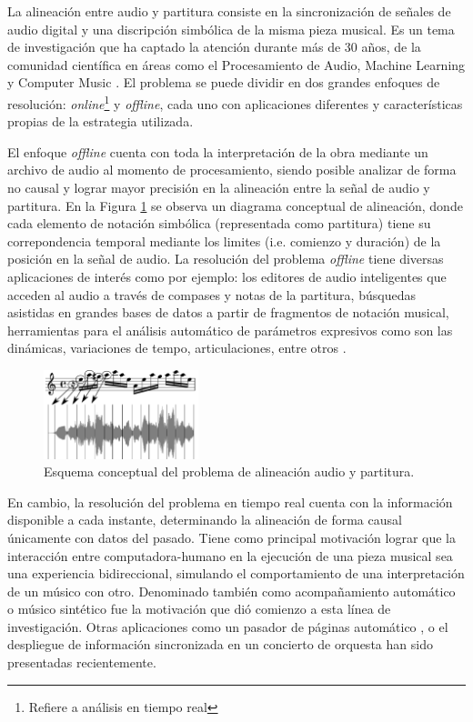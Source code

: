 \documentclass
  [ams,pdfout]%
	{aeslac}
\begin{document}
La alineación entre audio y partitura consiste en la sincronización de señales de audio digital y una discripción simbólica de la misma pieza musical. Es un tema de investigación que ha captado la atención durante más de 30 años, de la comunidad científica en áreas como el Procesamiento de Audio, Machine Learning y Computer Music \cite{orio2003score}. El problema se puede dividir en dos grandes enfoques de resolución: \textit{online}\footnote{Refiere a análisis en tiempo real} y \textit{offline}, cada uno con aplicaciones diferentes y características propias de la estrategia utilizada.

%
El enfoque \textit{offline} cuenta con toda la interpretación de la obra mediante un archivo de audio al momento de procesamiento, siendo posible analizar de forma no causal y lograr mayor precisión en la alineación entre la señal de audio y partitura. En la Figura \ref{fig:resultado_alineacion} se observa un diagrama conceptual de alineación, donde cada elemento de notación simbólica (representada como partitura) tiene su correpondencia temporal mediante los limites (i.e. comienzo y duración) de la posición en la señal de audio. La resolución del problema \textit{offline} tiene diversas aplicaciones de interés como por ejemplo: los editores de audio inteligentes que acceden al audio a través de compases y notas de la partitura, búsquedas asistidas en grandes bases de datos a partir de fragmentos de notación musical, herramientas para el análisis automático de parámetros expresivos como son las dinámicas, variaciones de tempo, articulaciones, entre otros \cite{dannenberg2006music}.

\begin{figure}[h!]
\begin{center}
\includegraphics[width=0.4\textwidth]{imagenes/resultado_alineacion} 
\caption{Esquema conceptual del problema de alineación audio y partitura.}
\label{fig:resultado_alineacion}
\end{center}
\end{figure} 

%
En cambio, la resolución del problema en tiempo real cuenta con la información disponible a cada instante, determinando la alineación de forma causal únicamente con datos del pasado. Tiene como principal motivación lograr que la interacción entre computadora-humano en la ejecución de una pieza musical sea una experiencia bidireccional, simulando el comportamiento de una interpretación de un músico con otro. Denominado también como acompañamiento automático o músico sintético \cite{vercoe1984synthetic} fue la motivación que dió comienzo a esta línea de investigación. Otras aplicaciones como un pasador de páginas automático \cite{arzt2008score}, o el despliegue de información sincronizada en un concierto de orquesta \cite{prockup2013orchestral} han sido presentadas recientemente.  
\end{document}
